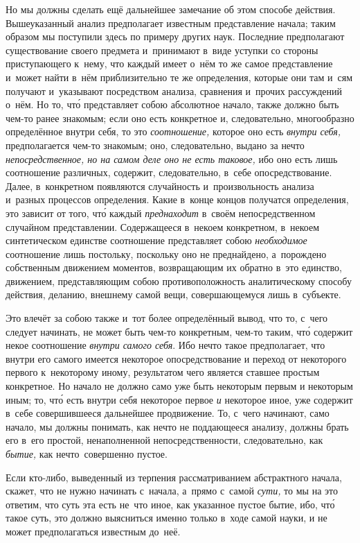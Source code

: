 Но мы должны сделать ещё дальнейшее замечание об этом способе действия.
Вышеуказанный анализ предполагает известным представление начала; таким образом
мы поступили здесь по примеру других наук. Последние предполагают существование
своего предмета и~принимают в~виде уступки со стороны приступающего к~нему, что
каждый имеет о~нём то же самое представление и~может найти в~нём приблизительно
те же определения, которые они там и~сям получают и~указывают посредством
анализа, сравнения и~прочих рассуждений о~нём. Но то, чт\'{о} представляет
собою абсолютное начало, также должно быть чем-то ранее знакомым; если оно есть
конкретное и, следовательно, многообразно определённое внутри себя, то это
{\em соотношение,} которое оно есть {\em внутри себя,} предполагается чем-то
знакомым; оно, следовательно, выдано за нечто {\em непосредственное, но на
самом деле оно не есть таковое,} ибо оно есть лишь соотношение различных,
содержит, следовательно, в~себе опосредствование. Далее, в~конкретном
появляются случайность и~произвольность анализа и~разных процессов определения.
Какие в~конце концов получатся определения, это зависит от того, чт\'{о} каждый
{\em преднаходит} в~своём непосредственном случайном представлении.
Содержащееся в~некоем конкретном, в~некоем синтетическом единстве соотношение
представляет собою {\em необходимое} соотношение лишь постольку, поскольку оно
не преднайдено, а~порождено собственным движением моментов, возвращающим их
обратно в~это единство, движением, представляющим собою противоположность
аналитическому способу действия, деланию, внешнему самой вещи, совершающемуся
лишь в~субъекте.

Это влечёт за собою также и~тот более определённый вывод, что то, с~чего
следует начинать, не может быть чем-то конкретным, чем-то таким, чт\'{о}
содержит некое соотношение {\em внутри самого себя}. Ибо нечто такое
предполагает, что внутри его самого имеется некоторое опосредствование и
переход от некоторого первого к~некоторому иному, результатом чего является
ставшее простым конкретное. Но начало не должно само уже быть некоторым первым
и некоторым иным; то, чт\'{о} есть внутри себя некоторое первое {\em и}
некоторое иное, уже содержит в~себе совершившееся дальнейшее продвижение. То,
с~чего начинают, само начало, мы должны понимать, как нечто не поддающееся
анализу, должны брать его в~его простой, ненаполненной непосредственности,
следовательно, как {\em бытие,} как нечто~совершенно пустое.

Если кто-либо, выведенный из терпения рассматриванием абстрактного начала,
скажет, что не нужно начинать с~начала, а~прямо с~самой {\em сути,} то мы на
это ответим, что суть эта есть не~что иное, как указанное пустое бытие, ибо,
чт\'{о} такое суть, это должно выясниться именно только в~ходе самой науки,
и не может предполагаться известным до~неё.

